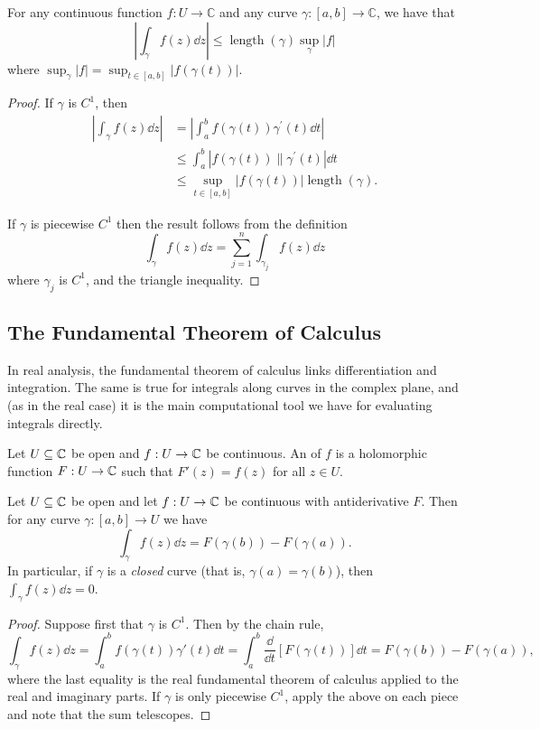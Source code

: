 \documentclass[a4paper]{scrartcl}
\begin{document}
\begin{proposition}
    For any continuous function $f: U \rightarrow \mathbb{C}$ and any curve $\gamma:[a, b] \rightarrow \mathbb{C}$, we have that
    $$
    \left|\int_{\gamma} f(z) \dd z\right| \leq \operatorname{length}(\gamma) \sup _{\gamma}|f|
    $$
    where $\sup _{\gamma}|f|=\sup _{t \in[a, b]}|f(\gamma(t))|$.
\end{proposition}
\begin{proof}
If $\gamma$ is $C^{1}$, then 
\begin{align*}
\left|\int_{\gamma} f(z) \dd z\right|&=\left|\int_{a}^{b} f(\gamma(t)) \gamma^{\prime}(t) \dd t\right| \\
&\leq\int_{a}^{b}\left|f(\gamma(t)) \| \gamma^{\prime}(t)\right| \dd t \\
&\leq \sup _{t \in[a, b]}|f(\gamma(t))| \operatorname{length}(\gamma).
\end{align*} 

If $\gamma$ is piecewise $C^{1}$ then the result follows from the definition 
$$\int_{\gamma} f(z) \dd z=\sum_{j=1}^{n} \int_{\gamma_{j}} f(z) \dd z$$ 
where $\gamma_{j}$ is $C^{1}$, and the triangle inequality.
\end{proof}

\subsection{The Fundamental Theorem of Calculus}

In real analysis, the fundamental theorem of calculus links differentiation and integration. The same is true for integrals along curves in the complex plane, and (as in the real case) it is the main computational tool we have for evaluating integrals directly.

\begin{definition}[Antiderivative]
    Let $U \subseteq \mathbb{C}$ be open and $f: U \rightarrow \mathbb{C}$ be continuous. An  of $f$ is a holomorphic function $F: U \rightarrow \mathbb{C}$ such that $F'(z) = f(z)$ for all $z \in U$.
\end{definition}

\begin{theorem}
    Let $U \subseteq \mathbb{C}$ be open and let $f : U \rightarrow \mathbb{C}$ be continuous with antiderivative $F$. Then for any curve $\gamma: [a, b] \rightarrow U$ we have
    $$
    \int_\gamma f(z) \dd z = F(\gamma(b)) - F(\gamma(a)).
    $$
    In particular, if $\gamma$ is a \emph{closed} curve (that is, $\gamma(a) = \gamma(b)$), then $\int_\gamma f(z) \dd z = 0$.
\end{theorem}
\begin{proof}
    Suppose first that $\gamma$ is $C^1$. Then by the chain rule,
    $$
    \int_\gamma f(z) \dd z = \int_a^b f(\gamma(t)) \gamma'(t) \dd t = \int_a^b \frac{\dd}{\dd t}\left[F(\gamma(t))\right] \dd t = F(\gamma(b)) - F(\gamma(a)),
    $$
    where the last equality is the real fundamental theorem of calculus applied to the real and imaginary parts. If $\gamma$ is only piecewise $C^1$, apply the above on each piece and note that the sum telescopes.
\end{proof}
\end{document}
